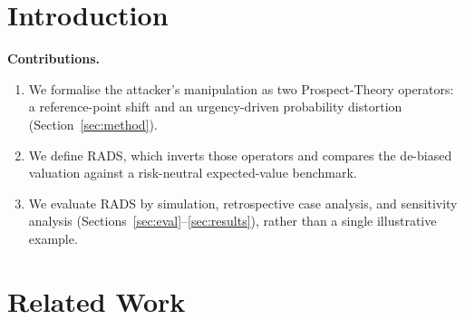 \documentclass[jcp,article,submit,pdftex,moreauthors]{Definitions/mdpi}
\begin{document}
\maketitle

\section{Introduction}
\cite{bib_statista}\cite{bib_cvedetails}\cite{bib_techcrunch}

\textbf{Contributions.} %
\begin{enumerate}
  \item We formalise the attacker's manipulation as two Prospect-Theory
        operators: a reference-point shift and an urgency-driven probability
        distortion (Section~\ref{sec:method}).
  \item We define RADS, which inverts those operators and compares the
        de-biased valuation against a risk-neutral expected-value benchmark.
  \item We evaluate RADS by simulation, retrospective case analysis, and
        sensitivity analysis (Sections~\ref{sec:eval}--\ref{sec:results}),
        rather than a single illustrative example.
\end{enumerate}

\section{Related Work}\label{sec:related}

\end{document}

